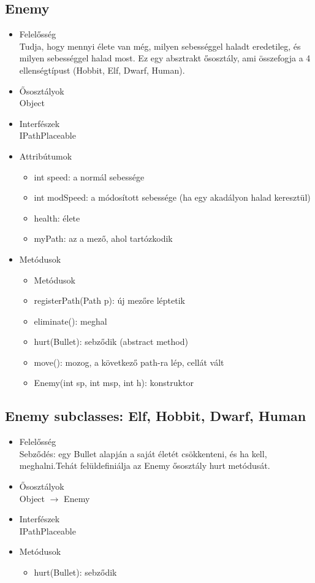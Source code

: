 \subsection{Enemy}
\begin{itemize}
\item Felelősség\\
Tudja, hogy mennyi élete van még, milyen sebességgel haladt eredetileg, és milyen sebességgel halad most. Ez egy absztrakt ősosztály, ami összefogja a 4 ellenségtípust (Hobbit, Elf, Dwarf, Human).
\item Ősosztályok\\
Object
\item Interfészek\\
IPathPlaceable
\item Attribútumok\\
	\begin{itemize}
		\item int speed: a normál sebessége
		\item int modSpeed: a módosított sebessége (ha egy akadályon halad keresztül)
		\item health: élete
		\item myPath: az a mező, ahol tartózkodik
	\end{itemize}
\item Metódusok\\
	\begin{itemize}
		\item Metódusok
		\item registerPath(Path p): új mezőre léptetik
		\item eliminate(): meghal
		\item hurt(Bullet): sebződik (abstract method)
		\item move(): mozog, a következő path-ra lép, cellát vált
		\item Enemy(int sp, int msp, int h): konstruktor
		
		
	\end{itemize}
\end{itemize}

\subsection{Enemy subclasses: Elf, Hobbit, Dwarf, Human}
\begin{itemize}
\item Felelősség\\
Sebződés: egy Bullet alapján a saját életét csökkenteni, és ha kell, meghalni.Tehát felüldefiniálja az Enemy ősosztály hurt metódusát.
\item Ősosztályok\\
Object $\rightarrow$ Enemy
\item Interfészek\\
IPathPlaceable

\item Metódusok\\
	\begin{itemize}
		\item hurt(Bullet): sebződik
		
	\end{itemize}
\end{itemize}

